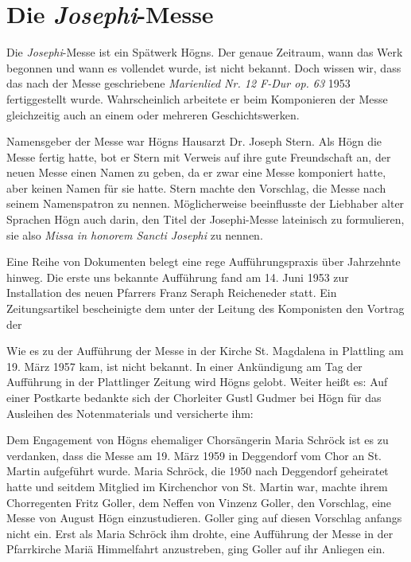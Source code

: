 \section{Die \textit{Josephi}{}-Messe}

Die \textit{Josephi}{}-Messe ist ein Spätwerk Högns. Der genaue
Zeitraum, wann das Werk begonnen und wann es vollendet wurde, ist nicht
bekannt. Doch wissen wir, dass das nach der Messe geschriebene
\textit{Marienlied Nr. 12 F-Dur op. 63} 1953 fertiggestellt wurde.
Wahrscheinlich arbeitete er beim Komponieren der Messe gleichzeitig
auch an einem oder mehreren Geschichtswerken.

Namensgeber der Messe war Högns Hausarzt Dr. Joseph Stern. Als Högn die
Messe fertig hatte, bot er Stern mit Verweis auf ihre gute Freundschaft
an, der neuen Messe einen Namen zu geben, da er zwar eine Messe
komponiert hatte, aber keinen Namen für sie hatte. Stern machte den
Vorschlag, die Messe nach seinem Namenspatron zu nennen. Möglicherweise
beeinflusste der Liebhaber alter Sprachen Högn auch darin, den Titel
der Josephi-Messe lateinisch zu formulieren, sie also \textit{Missa in
honorem Sancti Josephi} zu nennen.

Eine Reihe von Dokumenten belegt eine rege Aufführungspraxis über
Jahrzehnte hinweg. Die erste uns bekannte Aufführung fand am 14. Juni
1953 zur Installation des neuen Pfarrers Franz Seraph Reicheneder
statt. Ein Zeitungsartikel bescheinigte dem
 unter der Leitung des Komponisten
den  Vortrag der 

Wie es zu der Aufführung der Messe in der Kirche St. Magdalena in
Plattling am 19. März 1957 kam, ist nicht bekannt. In einer
Ankündigung am Tag der Aufführung in der Plattlinger Zeitung wird Högns
 gelobt.
Weiter heißt es:  Auf einer
Postkarte bedankte sich der Chorleiter Gustl Gudmer bei Högn für das
Ausleihen des Notenmaterials und versicherte ihm:  

Dem Engagement von Högns ehemaliger Chorsängerin Maria Schröck ist es zu
verdanken, dass die Messe am 19. März 1959 in Deggendorf vom Chor an
St. Martin aufgeführt wurde. Maria Schröck, die 1950 nach Deggendorf
geheiratet hatte und seitdem Mitglied im Kirchenchor von St. Martin
war, machte ihrem Chorregenten Fritz Goller, dem Neffen von Vinzenz
Goller, den Vorschlag, eine Messe von August Högn einzustudieren.
Goller ging auf diesen Vorschlag anfangs nicht ein. Erst als Maria
Schröck ihm drohte, eine Aufführung der Messe in der Pfarrkirche Mariä
Himmelfahrt anzustreben, ging Goller auf ihr Anliegen ein.

